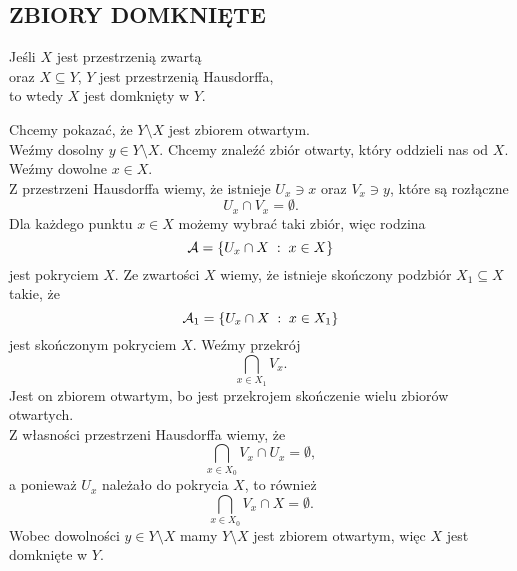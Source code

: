 \subsection{ZBIORY DOMKNIĘTE}
\begin{center}\large
    Jeśli $X$ jest przestrzenią zwartą \\oraz $X\subseteq Y$, $Y$ jest przestrzenią Hausdorffa, \\to wtedy $X$ jest domknięty w $Y$.
\end{center}\bigskip
\dowod
Chcemy pokazać, że $Y\setminus X$ jest zbiorem otwartym.\medskip\\
Weźmy dosolny $y\in Y\setminus X$. Chcemy znaleźć zbiór otwarty, który oddzieli nas od $X$. Weźmy dowolne $x\in X$.\medskip\\
Z przestrzeni Hausdorffa wiemy, że istnieje $U_x\ni x$ oraz $V_x\ni y$, które są rozłączne
$$U_x\cap V_x=\emptyset.$$
Dla każdego punktu $x\in X$ możemy wybrać taki zbiór, więc rodzina
$$\mathcal{A}=\{U_x\cap X\;:\;x\in X\}$$
jest pokryciem $X$. Ze zwartości $X$ wiemy, że istnieje skończony podzbiór $X_1\subseteq X$ takie, że
$$\mathcal{A}_1=\{U_x\cap X\;:\;x\in X_1\}$$
jest skończonym pokryciem $X$. Weźmy przekrój
$$\bigcap\limits_{x\in X_1}V_x.$$
Jest on zbiorem otwartym, bo jest przekrojem skończenie wielu zbiorów otwartych. \\Z własności przestrzeni Hausdorffa wiemy, że
$$\bigcap\limits_{x\in X_0}V_x\cap U_x=\emptyset,$$
a ponieważ $U_x$ należało do pokrycia $X$, to również
$$\bigcap\limits_{x\in X_0}V_x\cap X=\emptyset.$$
Wobec dowolności $y\in Y\setminus X$ mamy $Y\setminus X$ jest zbiorem otwartym, więc $X$ jest domknięte w $Y$.
\kondow

